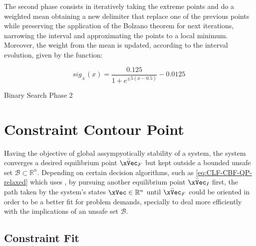The second phase consists in iteratively taking the extreme points and do a weighted mean obtaining a new delimiter that replace one of the previous points while preserving the application of the Bolzano theorem for next iterations, narrowing the interval and approximating the points to a local minimum. Moreover, the weight from the mean is updated, according to the interval evolution, given by the function:

\begin{equation}
    sig_{\pm}(x) = \frac{0.125}{1+e^{\pm5(x-0.5)}} -0.0125
    \label{eq:binsea_weight_update_function}
\end{equation}

  \begin{algorithm}
    \caption{Binary Search Phase 2} \label{alg:Binary_Search_Phase_2}
  \end{algorithm}



\newpage %


\section{Constraint Contour Point}
\label{sec:Constraint_Contour_Point}

Having the objective of global assympyotically stability of a system, the system converges a desired equilibrium point \(\bar{\xVec}_F\) but kept outside a bounded unsafe set \(\mathcal{B} \subset \mathbb{R}^n\). Depending on certain decision algorithms, such as \ref{eq:CLF-CBF-QP-relaxed} which uses , by pursuing another equilibrium point \(\bar{\xVec}_I\) first, the path taken by the system's states \(\xVec \in \mathbb{R}^n\) until \(\bar{\xVec}_F\) could be oriented in order to be a better fit for problem demands, specially to deal more efficiently with the implications of an unsafe set \(\mathcal{B}\).\\

\subsection{Constraint Fit}
\label{subsec:Constraint_Fit}


